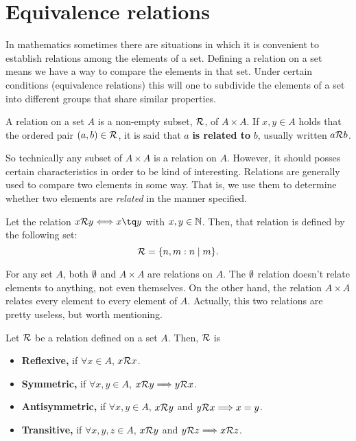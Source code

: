 \chapter{Equivalence relations}
\thispagestyle{noheaders}
In mathematics sometimes there are situations in which it is convenient to establish relations among the
elements of a set. Defining a relation on a set means we have a way to compare the elements in that set.
Under certain conditions (equivalence relations) this will one to subdivide the elements of a set into
different groups that share similar properties. \cite{chamizo02}

\begin{defi}[Relation]
    A relation on a set $A$ is a non-empty subset, $\mathcal{R}$, of $A\times A$. If $x, y\in A$ holds that
    the ordered pair $\left( a, b \right)\in\mathcal{R}$, it is said that $a$ \textbf{is related to} $b$, usually
    written $a\mathcal{R} b$.
\end{defi}

So technically any subset of $A\times A$ is a relation on $A$. However, it should posses certain
characteristics in order to be kind of interesting. Relations are generally used to compare two elements in
some way. That is, we use them to determine whether two elements are \textit{related} in the manner specified.

\begin{example}
   Let the relation $x\rela y\iff x\tq y$ with $x, y\in\mathbb{N}$. Then, that relation is defined by the following
   set:
   \begin{equation}
       \mathcal{R} = \{n, m : n\mid m\}.
   \end{equation}
\end{example}

\begin{remark}
    For any set $A$, both $\emptyset$ and $A\times A$ are relations on $A$. The $\emptyset$ relation doesn't relate elements to anything, not even themselves. On the other hand, the relation $A\times A$ relates every element to every element of $A$. Actually, this two relations are pretty useless, but worth mentioning.
\end{remark}

\begin{defi} \label{2:relation-props}
    Let $\mathcal{R}$ be a relation defined on a set $A$. Then, $\mathcal{R}$ is
    \begin{itemize}
        \item\textbf{Reflexive,} if $\forall x\in A$, $x\mathcal{R} x$.
        \item\textbf{Symmetric,} if $\forall x, y\in A$, $x\mathcal{R} y\Longrightarrow y\mathcal{R} x$.
        \item\textbf{Antisymmetric,} if $\forall x, y\in A$, $x\mathcal{R} y$ and $y\mathcal{R} x\Longrightarrow x = y$.
        \item\textbf{Transitive,} if $\forall x, y, z\in A$, $x\mathcal{R} y$ and $y\mathcal{R} z\Longrightarrow x\mathcal{R} z$.
    \end{itemize}
\end{defi}


